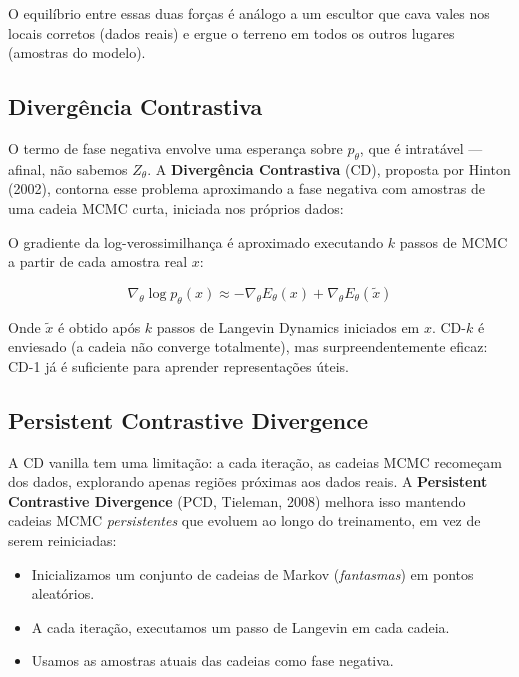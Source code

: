 \documentclass{tufte-handout}
\let\subsubsection\subsection
\begin{document}
O equilíbrio entre essas duas forças é análogo a um escultor que cava vales nos locais corretos (dados reais) e ergue o terreno em todos os outros lugares (amostras do modelo).

\subsubsection{Divergência Contrastiva}

O termo de fase negativa envolve uma esperança sobre $p_\theta$, que é intratável --- afinal, não sabemos $Z_\theta$. A \textbf{Divergência Contrastiva} (CD), proposta por Hinton (2002), contorna esse problema aproximando a fase negativa com amostras de uma cadeia MCMC curta, iniciada nos próprios dados:

\begin{defn}
O gradiente da log-verossimilhança é aproximado executando $k$ passos de MCMC a partir de cada amostra real $x$:

\begin{equation}
\nabla_\theta \log p_\theta(x) \approx -\nabla_\theta E_\theta(x) + \nabla_\theta E_\theta(\tilde{x})
\end{equation}

Onde $\tilde{x}$ é obtido após $k$ passos de Langevin Dynamics iniciados em $x$. CD-$k$ é enviesado (a cadeia não converge totalmente), mas surpreendentemente eficaz: CD-1 já é suficiente para aprender representações úteis.
\end{defn}

\subsubsection{Persistent Contrastive Divergence}

A CD vanilla tem uma limitação: a cada iteração, as cadeias MCMC recomeçam dos dados, explorando apenas regiões próximas aos dados reais. A \textbf{Persistent Contrastive Divergence} (PCD, Tieleman, 2008) melhora isso mantendo cadeias MCMC \textit{persistentes} que evoluem ao longo do treinamento, em vez de serem reiniciadas:

\begin{itemize}
    \item Inicializamos um conjunto de cadeias de Markov (\textit{fantasmas}) em pontos aleatórios.
    \item A cada iteração, executamos um passo de Langevin em cada cadeia.
    \item Usamos as amostras atuais das cadeias como fase negativa.
\end{itemize}
\end{document}

